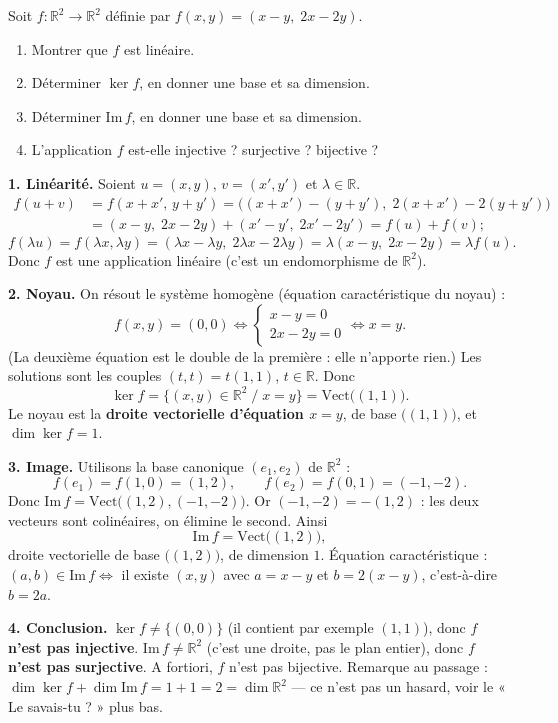 \documentclass[11pt]{article}
\newcommand{\cle}[1]{{\popxbold\color{popdark}#1}}
\newcounter{popsec}
\newcounter{popsub}
\newcommand{\courssub}[1]{%
  \stepcounter{popsub}%
  \par\vspace{9pt}\noindent{\popxbold\fontsize{11.5}{13}\selectfont\color{popink}{\color{poporange}\thepopsec.\thepopsub}\hspace{6pt}#1}\par\nopagebreak\vspace{4pt}
}
\begin{document}
\courssub{Un exemple complet dans $\mathbb{R}^2$}

\begin{exoresolu}[Noyau, image et bijectivité de $f(x,y) = (x - y,\; 2x - 2y)$]
Soit $f : \mathbb{R}^2 \to \mathbb{R}^2$ définie par $f(x,y) = (x - y,\; 2x - 2y)$.
\begin{enumerate}
\item Montrer que $f$ est linéaire.
\item Déterminer $\ker f$, en donner une base et sa dimension.
\item Déterminer $\mathrm{Im}\,f$, en donner une base et sa dimension.
\item L'application $f$ est-elle injective ? surjective ? bijective ?
\end{enumerate}
\tcblower
\textbf{1. Linéarité.} Soient $u = (x,y)$, $v = (x',y')$ et $\lambda \in \mathbb{R}$.
\begin{align*}
f(u+v) &= f(x+x',\, y+y') = \big((x+x') - (y+y'),\; 2(x+x') - 2(y+y')\big) \\
&= (x - y,\; 2x - 2y) + (x' - y',\; 2x' - 2y') = f(u) + f(v) ;
\end{align*}
\[ f(\lambda u) = f(\lambda x, \lambda y) = (\lambda x - \lambda y,\; 2\lambda x - 2\lambda y) = \lambda (x - y,\; 2x - 2y) = \lambda f(u). \]
Donc $f$ est une application linéaire (c'est un \cle{endomorphisme} de $\mathbb{R}^2$).

\textbf{2. Noyau.} On résout le système homogène (équation caractéristique du noyau) :
\[ f(x,y) = (0,0) \iff \begin{cases} x - y = 0 \\ 2x - 2y = 0 \end{cases} \iff x = y. \]
(La deuxième équation est le double de la première : elle n'apporte rien.) Les solutions sont les couples $(t, t) = t(1,1)$, $t \in \mathbb{R}$. Donc
\[ \ker f = \{ (x,y) \in \mathbb{R}^2 \;/\; x = y \} = \mathrm{Vect}\big((1,1)\big). \]
Le noyau est la \textbf{droite vectorielle d'équation $x = y$}, de base $\big((1,1)\big)$, et $\dim \ker f = 1$.

\textbf{3. Image.} Utilisons la base canonique $(e_1, e_2)$ de $\mathbb{R}^2$ :
\[ f(e_1) = f(1,0) = (1, 2), \qquad f(e_2) = f(0,1) = (-1, -2). \]
Donc $\mathrm{Im}\,f = \mathrm{Vect}\big((1,2), (-1,-2)\big)$. Or $(-1,-2) = -(1,2)$ : les deux vecteurs sont colinéaires, on élimine le second. Ainsi
\[ \mathrm{Im}\,f = \mathrm{Vect}\big((1,2)\big), \]
droite vectorielle de base $\big((1,2)\big)$, de dimension $1$. Équation caractéristique : $(a,b) \in \mathrm{Im}\,f \iff$ il existe $(x,y)$ avec $a = x - y$ et $b = 2(x-y)$, c'est-à-dire $\boxed{b = 2a}$.

\textbf{4. Conclusion.} $\ker f \neq \{(0,0)\}$ (il contient par exemple $(1,1)$), donc $f$ \textbf{n'est pas injective}. $\mathrm{Im}\,f \neq \mathbb{R}^2$ (c'est une droite, pas le plan entier), donc $f$ \textbf{n'est pas surjective}. A fortiori, $f$ n'est pas bijective. Remarque au passage : $\dim \ker f + \dim \mathrm{Im}\,f = 1 + 1 = 2 = \dim \mathbb{R}^2$ — ce n'est pas un hasard, voir le « Le savais-tu ? » plus bas.
\end{exoresolu}
\end{document}
